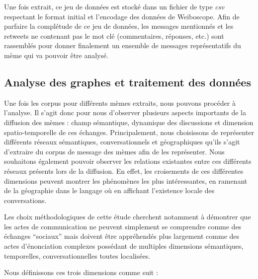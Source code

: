     Une fois extrait, ce jeu de données est stocké dans un fichier de type  \textit{csv} respectant le format initial et l'encodage des données de Weiboscope. Afin de parfaire la complétude de ce jeu de données, les messages mentionnés et les retweets ne contenant pas le mot clé (commentaires, réponses, etc.) sont rassemblés pour donner finalement un ensemble de messages représentatifs du mème qui va pouvoir être analysé.


\subsection[Analyse des graphes et traitement des données]{Analyse des graphes et traitement des données}

    Une fois les corpus pour différents mèmes extraits, nous pouvons procéder à l'analyse. Il s'agit donc pour nous d'observer plusieurs aspects importants de la diffusion des mèmes : champ sémantique, dynamique des discussions et dimension spatio-temporelle de ces échanges. Principalement, nous choisissons de représenter différents réseaux sémantiques, conversationnels et géographiques qu'ils s'agit d'extraire du corpus de message des mèmes afin de les représenter. Nous souhaitons également  pouvoir observer les relations existantes entre ces différents réseaux présents lors de la diffusion. En effet, les croisements de ces différentes dimensions peuvent montrer les phénomènes les plus intéressantes, en ramenant de la géographie dans le langage où en affichant l'existence locale des conversations.

    Les choix méthodologiques de cette étude cherchent notamment à démontrer que les actes de communication ne peuvent simplement se comprendre comme des échanges {\textquotedblleft}sociaux{\textquotedblright} mais doivent être appréhendés plus largement comme des actes d{\textquoteright}énonciation complexes possédant de multiples dimensions sémantiques, temporelles, conversationnelles toutes localisées.

    Nous définissons ces trois dimensions comme suit :

